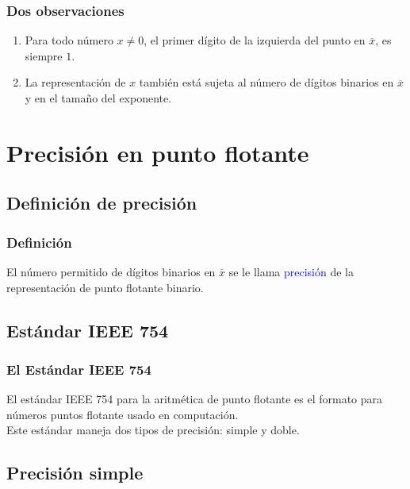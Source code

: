 \documentclass[12pt]{beamer}
\begin{document}
\begin{frame}
\frametitle{Dos observaciones}
\begin{enumerate}[<+->]
\item Para todo número $x \neq 0$, el primer dígito de la izquierda del punto en $\overline{x}$, es siempre $1$.
\item La representación de $x$ también está sujeta al número de dígitos binarios en $\overline{x}$ y en el tamaño del exponente.
\end{enumerate}
\end{frame}

\section{Precisión en punto flotante}
\subsection{Definición de precisión}

\begin{frame}
\frametitle{Definición}
El número permitido de dígitos binarios en $\overline{x}$ se le llama \textcolor{blue}{precisión} de la representación de punto flotante binario.
\end{frame}

\subsection{Estándar IEEE 754}
\begin{frame}
\frametitle{El Estándar IEEE 754}
El estándar IEEE 754 para la aritmética de punto flotante es el formato para números puntos flotante usado en computación.
\\
\bigskip
\pause
Este estándar maneja dos tipos de precisión: \textcolor{lava}{simple} y \textcolor{ao}{doble}.
\end{frame}

\subsection{Precisión simple}
\end{document}
